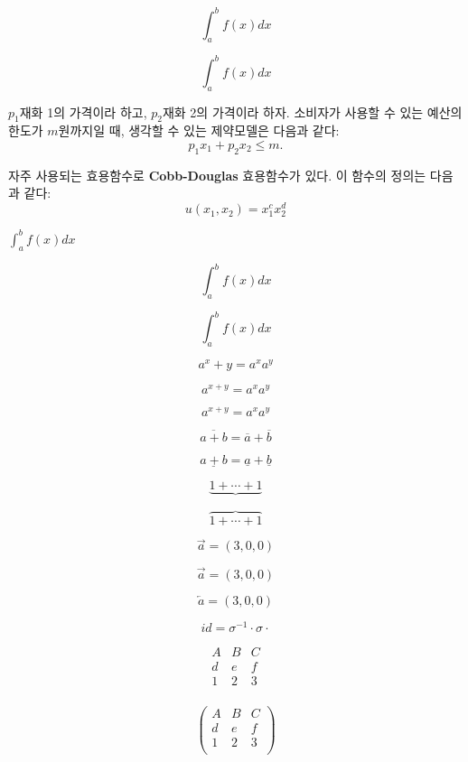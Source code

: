 \documentclass{oblivoir}
\theoremstyle{definition}
\begin{document}
\[ \int_{a}^b f(x)dx \]

\begin{equation}
\int_{a}^b f(x) dx
\end{equation}

$p_1$\을 재화 1의 가격이라 하고, $p_2$\을 재화 2의 가격이라 하자. 소비자가 사용할 수 있는 예산의 한도가 $m$원까지일 때, 생각할 수 있는 제약모델은 다음과 같다:
\begin{equation}
p_1 x_1 + p_2 x_2 
\leq m.
\end{equation}

자주 사용되는 효용함수로 \textbf{Cobb-Douglas} 효용함수가 있다. 이 함수의 정의는 다음과 같다:
\[ u(x_1, x_2) = x_1^c x_2^d \]

$\int_a^b f(x)dx$

\[ \int_{a}^b f(x)dx \]

\begin{equation}
\int_{a}^b f(x) dx
\end{equation}

\begin{equation}
a^x+y = a^x a^y
\end{equation}

\begin{equation*}
a^{x+y} = a^x a^y
\end{equation*}

\[ a^{x+y} = a^x a^y \]

\[ \overline{a+b} = \overline{a} + \overline{b} \]

\[ \underline{a+b} = \underline{a} + \underline{b} \]

\[ \underbrace{1+ \cdots + 1}\]

\[ \overbrace{1+ \cdots +1} \]

\[ \vec{a}=\left(3,0,0\right) \]

\[ \overrightarrow{a}=\left(3,0,0\right) \]

\[ \overleftarrow{a}=\left(3,0,0\right) \]

\[ id = \sigma^{-1} \cdot \sigma \cdot \]

\[\begin{matrix}
A & B & C \\
d & e & f \\
1 & 2 & 3 \\
\end{matrix}
\]

\[\begin{pmatrix}
A & B & C \\
d & e & f \\
1 & 2 & 3 \\
\end{pmatrix}
\]
\end{document}
